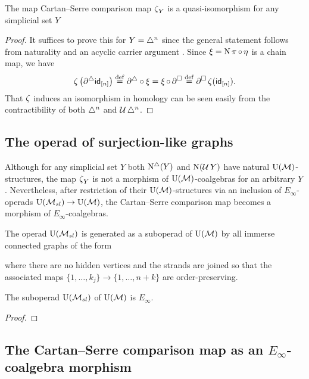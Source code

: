 \begin{lemma}
	The map Cartan--Serre comparison map $\operatorname{\zeta}_Y$ is a quasi-isomorphism for any simplicial set $Y$
\end{lemma}

\begin{proof}
	It suffices to prove this for $Y = \triangle^n$ since the general statement follows from naturality and an acyclic carrier argument \cite{eilenberg1953acyclic}.
	Since $\operatorname{\xi} = \operatorname{N} \operatorname{\pi} \circ \operatorname{\eta}$ is a chain map, we have
	\begin{align*}
	\operatorname{\zeta} \big( \partial^\triangle \mathsf{id}_{[n]} \big) \stackrel{\mathrm{def}}{=}
	\partial^\triangle \circ \operatorname{\xi} =
	\operatorname{\xi} \circ \, \partial^\square \stackrel{\mathrm{def}}{=}
	\partial^\square \operatorname{\zeta} (\mathsf{id}_{[n]}).
	\end{align*}
	That $\operatorname{\zeta}$ induces an isomorphism in homology can be seen easily from the contractibility of both $\triangle^n$ and $\operatorname{\mathcal{U}} \triangle^n$.
\end{proof}

\subsection{The operad of surjection-like graphs} \label{ss:surjection-like graphs}

Although for any simplicial set $Y$ both $\operatorname{N^{\triangle}}(Y)$ and $\operatorname{N}(\operatorname{\mathcal{U}} Y)$ have natural ${\operatorname{U}(\mathcal{M})}$-structures, the map $\operatorname{\zeta}_Y$ is not a morphism of ${\operatorname{U}(\mathcal{M})}$-coalgebras for an arbitrary $Y$.
Nevertheless, after restriction of their ${\operatorname{U}(\mathcal{M})}$-structures via an inclusion of $E_\infty$-operads ${\operatorname{U}(\mathcal{M}_{sl})} \to {\operatorname{U}(\mathcal{M})}$, the Cartan--Serre comparison map becomes a morphism of $E_\infty$-coalgebras.

The operad ${\operatorname{U}(\mathcal{M}_{sl})}$ is generated as a suboperad of ${\operatorname{U}(\mathcal{M})}$ by all immerse connected graphs of the form

where there are no hidden vertices and the strands are joined so that the associated maps $\{1, \dots, k_j\} \to \{1, \dots, n+k\}$ are order-preserving.

\begin{proposition} \label{p:simplicialandcubical}
	The suboperad ${\operatorname{U}(\mathcal{M}_{sl})}$ of ${\operatorname{U}(\mathcal{M})}$ is $E_\infty$.
\end{proposition}

\begin{proof}
\end{proof}

\subsection{The Cartan--Serre comparison map as an $E_\infty$-coalgebra morphism} \label{ss:the cartan-serre chain map}

